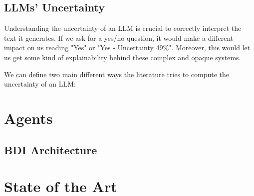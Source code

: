 \subsection{LLMs' Uncertainty}
\label{sub:llms_uncertainty}

Understanding the uncertainty of an LLM is crucial to correctly interpret the
text it generates. If we ask for a yes/no question, it would make a different
impact on us reading "Yes" or "Yes - Uncertainty 49\%". Moreover, this would let
us get some kind of explainability behind these complex and opaque systems.

We can define two main different ways the literature tries to compute the uncertainty
of an LLM:
\section{Agents}
\label{sec:agents}
\subsection{BDI Architecture}
\label{sub:bdi_architecture}
\section{State of the Art}
\label{sec:state_of_the_art}